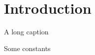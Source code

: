 \documentclass[a4paper,twoside,justified,marginals=raggedright,nofonts,nobib,]{tufte-book}
\begin{document}
\listofalgorithms

\chapter{Introduction}
\label{chap:intro}

\begin{algorithm}
    \caption[Short caption]{A long caption}
    \begin{algorithmic}[1]
        \Require 
        Some constants
    \end{algorithmic}
\end{algorithm}
\end{document}
